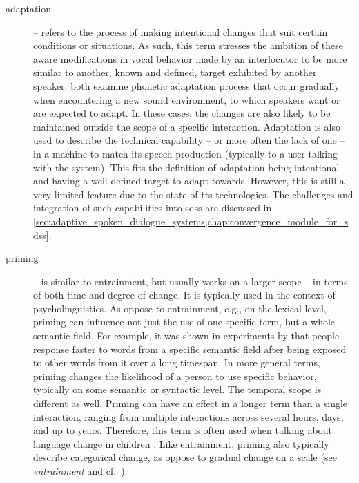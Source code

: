\begin{description}
	\item[adaptation] -- refers to the process of making intentional changes that suit certain conditions or situations.
	As such, this term stresses the ambition of these aware modifications in vocal behavior made by an interlocutor to be more similar to another, known and defined, target exhibited by another speaker.
	\citet{Kang2010emergence, Hwang2015phonetic} both examine phonetic adaptation process that occur gradually when encountering a new sound environment, to which speakers want or are expected to adapt.
	In these cases, the changes are also likely to be maintained outside the scope of a specific interaction.
	Adaptation is also used to describe the technical capability -- or more often the lack of one -- in a machine to match its speech production (typically to a user talking with the system).
	This fits the definition of adaptation being intentional and having a well-defined target to adapt towards.
	However, this is still a very limited feature due to the state of \ac{tts} technologies.
	The challenges and integration of such capabilities into \acp{sds} are discussed in \cref{sec:adaptive_spoken_dialogue_systems,chap:convergence_module_for_sdss}.
	
	\item[priming] -- is similar to entrainment, but usually works on a larger scope -- in terms of both time and degree of change.
	It is typically used in the context of psycholinguistics.
	As oppose to entrainment, e.g., on the lexical level, priming can influence not just the use of one specific term, but a whole semantic field.
	For example, it was shown in experiments by \citet{Meyer1971facilitation, Schvaneveldt1973retrieval} that people response faster to words from a specific semantic field after being exposed to other words from it over a long timespan.
	In more general terms, priming changes the likelihood of a person to use specific behavior, typically on some semantic or syntactic level.
	The temporal scope is different as well.
	Priming can have an effect in a longer term than a single interaction, ranging from multiple interactions across several hours, days, and up to years.
	Therefore, this term is often used when talking about language change in children \citep[see, e.g., ][]{Huttenlocher2004syntactic, Wansink2012would}.
	Like entrainment, priming also typically describe categorical change, as oppose to gradual change on a scale (see \textit{entrainment} and cf.\ \citet{Reitter2006computational, Pace2013concept}).
	

\end{description}
